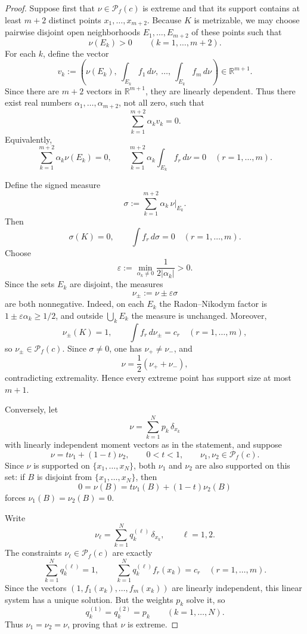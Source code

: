 \documentclass[11pt]{amsart}
\theoremstyle{definition}
\newcommand{\R}{\mathbb R}
\newcommand{\cP}{\mathcal P}
\begin{document}
\begin{proof}
Suppose first that $\nu\in \cP_f(c)$ is extreme and that its support contains at least $m+2$ distinct points $x_1,\dots,x_{m+2}$. Because $K$ is metrizable, we may choose pairwise disjoint open neighborhoods $E_1,\dots,E_{m+2}$ of these points such that
\[
\nu(E_k)>0
\qquad (k=1,\dots,m+2).
\]
For each $k$, define the vector
\[
v_k:=\left(\nu(E_k),\ \int_{E_k} f_1\,d\nu,\ \dots,\ \int_{E_k} f_m\,d\nu\right)\in \R^{m+1}.
\]
Since there are $m+2$ vectors in $\R^{m+1}$, they are linearly dependent. Thus there exist real numbers $\alpha_1,\dots,\alpha_{m+2}$, not all zero, such that
\[
\sum_{k=1}^{m+2}\alpha_k v_k=0.
\]
Equivalently,
\[
\sum_{k=1}^{m+2}\alpha_k \nu(E_k)=0,
\qquad
\sum_{k=1}^{m+2}\alpha_k \int_{E_k} f_r\,d\nu=0
\quad (r=1,\dots,m).
\]

Define the signed measure
\[
\sigma:=\sum_{k=1}^{m+2}\alpha_k\,\nu|_{E_k}.
\]
Then
\[
\sigma(K)=0,
\qquad
\int f_r\,d\sigma=0
\quad (r=1,\dots,m).
\]
Choose
\[
\varepsilon:=\min_{\alpha_k\neq 0}\frac{1}{2|\alpha_k|}>0.
\]
Since the sets $E_k$ are disjoint, the measures
\[
\nu_\pm:=\nu\pm \varepsilon \sigma
\]
are both nonnegative. Indeed, on each $E_k$ the Radon--Nikodym factor is $1\pm \varepsilon\alpha_k\ge 1/2$, and outside $\bigcup_k E_k$ the measure is unchanged. Moreover,
\[
\nu_\pm(K)=1,
\qquad
\int f_r\,d\nu_\pm=c_r
\quad (r=1,\dots,m),
\]
so $\nu_\pm\in \cP_f(c)$. Since $\sigma\neq 0$, one has $\nu_+\neq \nu_-$, and
\[
\nu=\frac12(\nu_++\nu_-),
\]
contradicting extremality. Hence every extreme point has support size at most $m+1$.

Conversely, let
\[
\nu=\sum_{k=1}^N p_k\,\delta_{x_k}
\]
with linearly independent moment vectors as in the statement, and suppose
\[
\nu=t\nu_1+(1-t)\nu_2,
\qquad
0<t<1,
\qquad
\nu_1,\nu_2\in \cP_f(c).
\]
Since $\nu$ is supported on $\{x_1,\dots,x_N\}$, both $\nu_1$ and $\nu_2$ are also supported on this set: if $B$ is disjoint from $\{x_1,\dots,x_N\}$, then
\[
0=\nu(B)=t\nu_1(B)+(1-t)\nu_2(B)
\]
forces $\nu_1(B)=\nu_2(B)=0$.

Write
\[
\nu_\ell=\sum_{k=1}^N q_k^{(\ell)}\,\delta_{x_k},
\qquad \ell=1,2.
\]
The constraints $\nu_\ell\in \cP_f(c)$ are exactly
\[
\sum_{k=1}^N q_k^{(\ell)}=1,
\qquad
\sum_{k=1}^N q_k^{(\ell)} f_r(x_k)=c_r
\quad (r=1,\dots,m).
\]
Since the vectors $(1,f_1(x_k),\dots,f_m(x_k))$ are linearly independent, this linear system has a unique solution. But the weights $p_k$ solve it, so
\[
q_k^{(1)}=q_k^{(2)}=p_k
\qquad (k=1,\dots,N).
\]
Thus $\nu_1=\nu_2=\nu$, proving that $\nu$ is extreme.
\end{proof}
\end{document}
